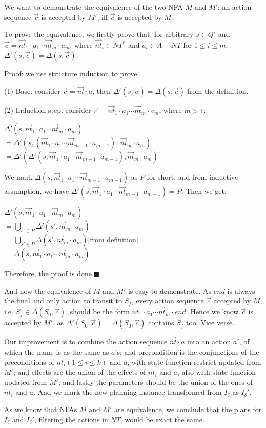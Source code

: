\documentclass{article}
\begin{document}
We want to demonstrate the equivalence of the two NFA $M$ and $M'$:
an action sequence $\vec{c}$ is accepted by $M'$, iff $\vec{c}$ is accepted by $M$.

To prove the equivalence, we firstly prove that:
for arbitrary $s\in Q'$ and $\vec{c}=\vec{nt}_1\cdot a_1\cdots \vec{nt}_m\cdot a_m$,
where $\vec{nt}_i\in NT^*$ and $a_i\in A-NT$ for $1\leq i\leq m$, $\Delta'(s,\vec{c})=\Delta(s,\vec{c})$.

Proof: we use structure induction to prove.

(1) Base: consider $\vec{c}=\vec{nt}\cdot a$, then $\Delta'(s,\vec{c})=\Delta(s,\vec{c})$ from the definition.

(2) Induction step: consider $\vec{c}=\vec{nt}_1\cdot a_1\cdots \vec{nt}_m\cdot a_m$, where $m>1$:

$\Delta'(s,\vec{nt}_1\cdot a_1\cdots \vec{nt}_m\cdot a_m)$\\
$=\Delta'(s,(\vec{nt}_1\cdot a_1\cdots \vec{nt}_{m-1}\cdot a_{m-1})\cdot\vec{nt}_m\cdot a_m)$\\
$=\Delta'(\Delta'(s,\vec{nt}_1\cdot a_1\cdots \vec{nt}_{m-1}\cdot a_{m-1}),\vec{nt}_m\cdot a_m)$

We mark $\Delta(s,\vec{nt}_1\cdot a_1\cdots \vec{nt}_{m-1}\cdot a_{m-1})$ as $P$ for short, and from inductive assumption, we have $\Delta'(s,\vec{nt}_1\cdot a_1\cdots \vec{nt}_{m-1}\cdot a_{m-1})=P$. Then we get:

$\Delta'(s,\vec{nt}_1\cdot a_1\cdots \vec{nt}_m\cdot a_m)$\\
$=\bigcup_{s'\in P}\Delta'(s',\vec{nt}_m\cdot a_m)$\\
$=\bigcup_{s'\in P}\Delta(s',\vec{nt}_m\cdot a_m)$[from definition]\\
$=\Delta(s,\vec{nt}_1\cdot a_1\cdots \vec{nt}_m\cdot a_m)$

Therefore, the proof is done.$\blacksquare$

And now the equivalence of $M$ and $M'$ is easy to demonstrate. As $end$ is always the final and only action to transit to $S_f$, every action sequence $\vec{c}$ accepted by $M$, i.e. $S_f\in\Delta(S_0,\vec{c})$, should
be the form $\vec{nt}_1\cdot a_1\cdots \vec{nt}_m\cdot end$. Hence we know $\vec{c}$ is accepted by $M'$, as $\Delta'(S_0,\vec{c})=\Delta(S_0,\vec{c})$ contains $S_f$ too. Vice verse.

Our improvement is to combine the action sequence $\vec{nt}\cdot a$ into an action $a'$, of which the name is as the same as $a$'s; and precondition is the conjunctions of the preconditions of $nt_i(1\leq i\leq k)$ and $a$, with state function restrict updated from $M'$; and effects are the union of the effects of $nt_i$ and $a$, also with state function updated from $M'$; and lastly the parameters should be the union of the ones of $nt_i$ and $a$. And we mark the new planning instance transformed from $I_\delta$ as $I_\delta'$.

As we know that NFAs $M$ and $M'$ are equivalence, we conclude that the plans for $I_\delta$ and $I_\delta'$, filtering the actions in $NT$, would be exact the same.
\end{document}
